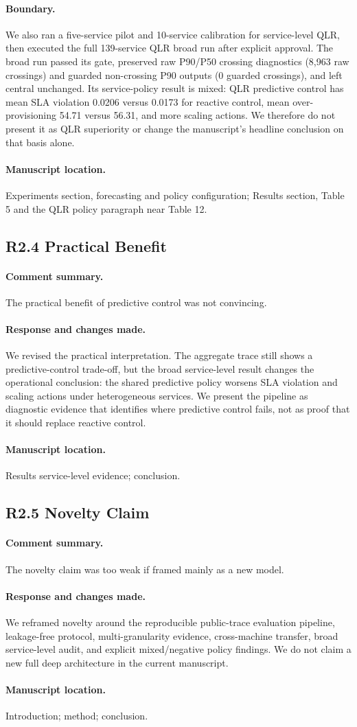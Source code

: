 \documentclass[11pt]{article}
\newcommand{\code}[1]{\texttt{\detokenize{#1}}}
\newcommand{\resp}[3]{\paragraph{Comment summary.} #1\par\paragraph{Response and changes made.} #2\par\paragraph{Manuscript location.} #3\par}
\begin{document}
\paragraph{Boundary.} We also ran a five-service pilot and 10-service calibration for service-level QLR, then executed the full 139-service QLR broad run after explicit approval. The broad run passed its gate, preserved raw P90/P50 crossing diagnostics (8,963 raw crossings) and guarded non-crossing P90 outputs (0 guarded crossings), and left central \code{metrics.csv} unchanged. Its service-policy result is mixed: QLR predictive control has mean SLA violation 0.0206 versus 0.0173 for reactive control, mean over-provisioning 54.71 versus 56.31, and more scaling actions. We therefore do not present it as QLR superiority or change the manuscript's headline conclusion on that basis alone.
\paragraph{Manuscript location.} Experiments section, forecasting and policy configuration; Results section, Table 5 and the QLR policy paragraph near Table 12.

\subsection*{R2.4 Practical Benefit}
\resp{The practical benefit of predictive control was not convincing.}{We revised the practical interpretation. The aggregate trace still shows a predictive-control trade-off, but the broad service-level result changes the operational conclusion: the shared predictive policy worsens SLA violation and scaling actions under heterogeneous services. We present the pipeline as diagnostic evidence that identifies where predictive control fails, not as proof that it should replace reactive control.}{Results service-level evidence; conclusion.}

\subsection*{R2.5 Novelty Claim}
\resp{The novelty claim was too weak if framed mainly as a new model.}{We reframed novelty around the reproducible public-trace evaluation pipeline, leakage-free protocol, multi-granularity evidence, cross-machine transfer, broad service-level audit, and explicit mixed/negative policy findings. We do not claim a new full deep architecture in the current manuscript.}{Introduction; method; conclusion.}
\end{document}
